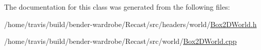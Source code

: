 The documentation for this class was generated from the following files\-:\begin{DoxyCompactItemize}
\item 
/home/travis/build/bender-\/wardrobe/\-Recast/src/headers/world/\hyperlink{_box2_d_world_8h}{Box2\-D\-World.\-h}\item 
/home/travis/build/bender-\/wardrobe/\-Recast/src/world/\hyperlink{_box2_d_world_8cpp}{Box2\-D\-World.\-cpp}\end{DoxyCompactItemize}
